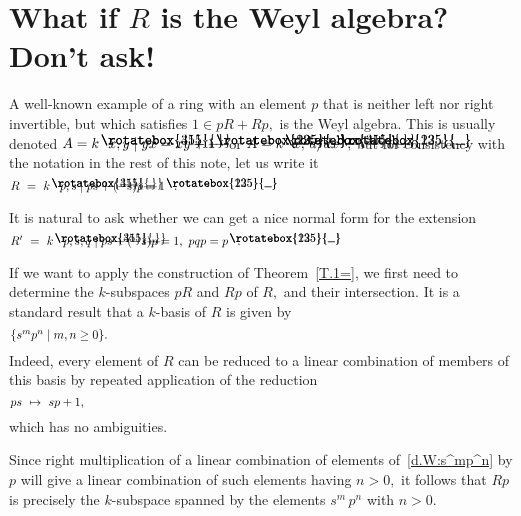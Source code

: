 \documentclass{amsart}
\DeclareRobustCommand{\lang}{\begin{picture}(5,7)
\put(1.2,2.5){\rotatebox{45}{\line(1,0){6.0}}}
\put(1.2,2.5){\rotatebox{315}{\line(1,0){6.0}}}
\end{picture}\kern.16em}
\DeclareRobustCommand{\rang}{\kern.1em\begin{picture}(5,7)
\put(.1,2.5){\rotatebox{135}{\line(1,0){6.0}}}
\put(.1,2.5){\rotatebox{225}{\line(1,0){6.0}}}
\end{picture}}
\begin{document}
\section{What if $R$ is the Weyl algebra?  Don't ask!}\label{S.Weyl}

A well-known example of a ring with an element $p$ that is
neither left nor right invertible, but which satisfies $1\in pR+Rp,$
is the Weyl algebra.
This is usually denoted $A=k\lang x,y\mid yx=xy+1\rang$
or $A=k\lang x,\,d/dx\rang;$ but for consistency with the
notation in the rest of this note, let us write it
\begin{equation}\begin{minipage}[c]{35pc}\label{d.Weyl}
$R\ =\ k\lang\,p,s\mid ps + (-s)p = 1\rang\,.$
\end{minipage}\end{equation}

It is natural to ask whether we can get a
nice normal form for the extension
\begin{equation}\begin{minipage}[c]{35pc}\label{d.W:R'=}
$R'\ =\ k\lang\,p,s,q\mid ps + (-s)p = 1,\ pqp=p\rang\,.$
\end{minipage}\end{equation}

If we want to apply the construction of Theorem~\ref{T.1=},
we first need to determine the $\!k\!$-subspaces
$pR$ and $Rp$ of $R,$ and their intersection.
It is a standard result that a $\!k\!$-basis of $R$ is given by
\begin{equation}\begin{minipage}[c]{35pc}\label{d.W:s^mp^n}
$\{s^m p^n\mid m,n\geq 0\}.$
\end{minipage}\end{equation}
Indeed, every element of $R$ can be reduced to
a linear combination of members of this basis by
repeated application of the reduction
\begin{equation}\begin{minipage}[c]{35pc}\label{d.W:ps|->}
$ps\ \mapsto\ sp+1,$
\end{minipage}\end{equation}
which has no ambiguities.

Since right multiplication of a linear combination of
elements of~\eqref{d.W:s^mp^n} by $p$ will give a linear
combination of such elements having $n>0,$
it follows that $Rp$ is precisely the $\!k\!$-subspace
spanned by the elements $s^m\,p^n$ with $n>0.$
\end{document}
